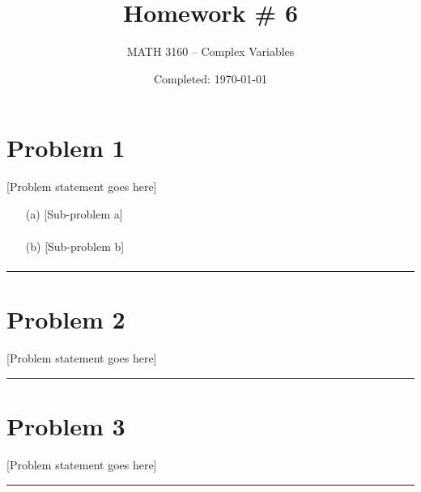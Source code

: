 \documentclass{article}
\title{Homework \# 6}
\author{
  MATH 3160 -- Complex Variables\\
  \myauthor
}
\date{Completed: \today}
\begin{document}
\maketitle %


\section*{Problem 1}
[Problem statement goes here]

\begin{enumerate}
\item[(a)] [Sub-problem a]
  \begin{align*}
  \end{align*}
  
\item[(b)] [Sub-problem b]
  \begin{align*}
  \end{align*}
\end{enumerate}

\vspace{.5cm} %

\hrule %

\newpage
\section*{Problem 2}
[Problem statement goes here]

\begin{center}
\end{center}

\vspace{.5cm} %

\hrule

\newpage
\section*{Problem 3}
[Problem statement goes here]

\vspace{.5cm} %

\hrule

\end{document}

